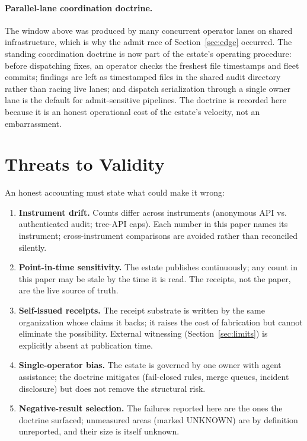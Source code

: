\paragraph{Parallel-lane coordination doctrine.} The window above was produced by many concurrent operator lanes on shared infrastructure, which is why the admit race of Section~\ref{sec:edge} occurred. The standing coordination doctrine is now part of the estate's operating procedure: before dispatching fixes, an operator checks the freshest file timestamps and fleet commits; findings are left as timestamped files in the shared audit directory rather than racing live lanes; and dispatch serialization through a single owner lane is the default for admit-sensitive pipelines. The doctrine is recorded here because it is an honest operational cost of the estate's velocity, not an embarrassment.

\section{Threats to Validity}
\label{sec:threats}

An honest accounting must state what could make it wrong:
\begin{enumerate}
\item \textbf{Instrument drift.} Counts differ across instruments (anonymous API vs. authenticated audit; tree-API caps). Each number in this paper names its instrument; cross-instrument comparisons are avoided rather than reconciled silently.
\item \textbf{Point-in-time sensitivity.} The estate publishes continuously; any count in this paper may be stale by the time it is read. The receipts, not the paper, are the live source of truth.
\item \textbf{Self-issued receipts.} The receipt substrate is written by the same organization whose claims it backs; it raises the cost of fabrication but cannot eliminate the possibility. External witnessing (Section~\ref{sec:limits}) is explicitly absent at publication time.
\item \textbf{Single-operator bias.} The estate is governed by one owner with agent assistance; the doctrine mitigates (fail-closed rules, merge queues, incident disclosure) but does not remove the structural risk.
\item \textbf{Negative-result selection.} The failures reported here are the ones the doctrine surfaced; unmeasured areas (marked UNKNOWN) are by definition unreported, and their size is itself unknown.
\end{enumerate}
